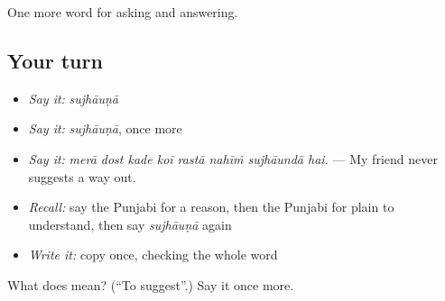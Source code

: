 \begin{grammarlens}[title={What you've built}]
One more word for asking and answering.
\end{grammarlens}

\subsection*{Your turn}
\begin{itemize}
\raggedright
  \item \emph{Say it:} \emph{sujhāuṇā}
  \item \emph{Say it:} \emph{sujhāuṇā}, once more
  \item \emph{Say it:} \emph{merā dost kade koī rastā nahīṁ sujhāundā hai.} — My friend never suggests a way out.
  \item \emph{Recall:} say the Punjabi for a reason, then the Punjabi for plain to understand, then say \emph{sujhāuṇā} again
  \item \emph{Write it:} copy \textbf{} once, checking the whole word
\end{itemize}

\begin{tcolorbox}[breakable,colback=teal!4,colframe=teal!35!black,title={Before you move on}]
What does  mean? (\textquotedblleft{}To suggest\textquotedblright{}.) Say it once more.
\end{tcolorbox}
